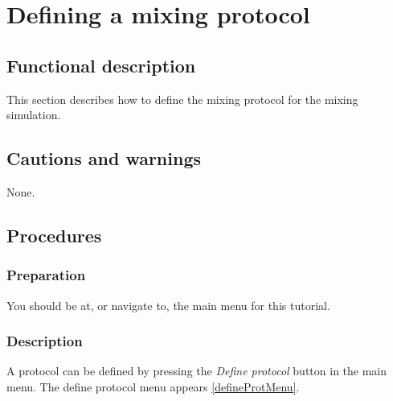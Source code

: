 
\section{Defining a mixing protocol}
\label{sec:defineMixProt}

\subsection{Functional description}
This section describes how to define the mixing protocol for the mixing simulation.

\subsection{Cautions and warnings}
None.

\subsection{Procedures}
\subsubsection{Preparation}
%
You should be at, or navigate to, the main menu for this tutorial.

\subsubsection{Description}

A protocol can be defined by pressing the \emph{Define protocol} button in the main menu. The define protocol menu appears \ref{defineProtMenu}.

